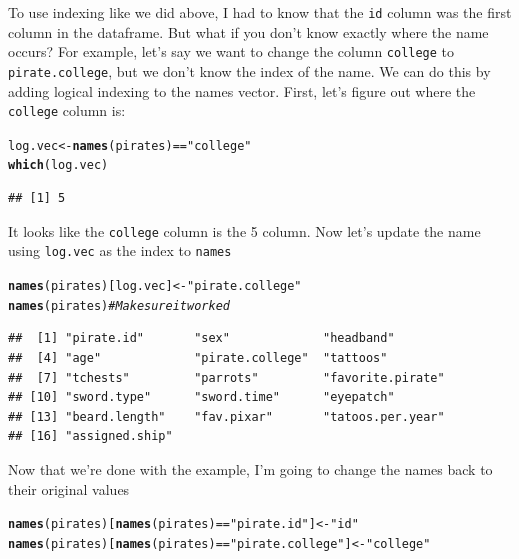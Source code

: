 \documentclass{tufte-book}\usepackage[]{graphicx}\usepackage[]{color}
\makeatletter
\newcommand{\hlstr}[1]{\textcolor[rgb]{0.192,0.494,0.8}{#1}}%
\newcommand{\hlcom}[1]{\textcolor[rgb]{0.678,0.584,0.686}{\textit{#1}}}%
\newcommand{\hlopt}[1]{\textcolor[rgb]{0,0,0}{#1}}%
\newcommand{\hlstd}[1]{\textcolor[rgb]{0.345,0.345,0.345}{#1}}%
\newcommand{\hlkwb}[1]{\textcolor[rgb]{0.69,0.353,0.396}{#1}}%
\newcommand{\hlkwd}[1]{\textcolor[rgb]{0.737,0.353,0.396}{\textbf{#1}}}%
\newenvironment{kframe}{%
 \def\at@end@of@kframe{}%
 \ifinner\ifhmode%
  \def\at@end@of@kframe{\end{minipage}}%
  \begin{minipage}{\columnwidth}%
 \fi\fi%
 \def\FrameCommand##1{\hskip\@totalleftmargin \hskip-\fboxsep
 \colorbox{shadecolor}{##1}\hskip-\fboxsep
     \hskip-\linewidth \hskip-\@totalleftmargin \hskip\columnwidth}%
 \MakeFramed {\advance\hsize-\width
   \@totalleftmargin\z@ \linewidth\hsize
   \@setminipage}}%
 {\par\unskip\endMakeFramed%
 \at@end@of@kframe}
\newenvironment{knitrout}{}{} %
\makeatother
\begin{document}
To use indexing like we did above, I had to know that the \texttt{id} column was the first column in the dataframe. But what if you don't know exactly where the name occurs? For example, let's say we want to change the column \texttt{college} to \texttt{pirate.college}, but we don't know the index of the name. We can do this by adding logical indexing to the names vector. First, let's figure out where the \texttt{college} column is:

\begin{knitrout}
\color{fgcolor}\begin{kframe}
\begin{alltt}
\hlstd{log.vec} \hlkwb{<-} \hlkwd{names}\hlstd{(pirates)} \hlopt{==} \hlstr{"college"}
\hlkwd{which}\hlstd{(log.vec)}
\end{alltt}
\begin{verbatim}
## [1] 5
\end{verbatim}
\end{kframe}
\end{knitrout}

It looks like the \texttt{college} column is the 5 column. Now let's update the name using \texttt{log.vec} as the index to \texttt{names}

\begin{knitrout}
\color{fgcolor}\begin{kframe}
\begin{alltt}
\hlkwd{names}\hlstd{(pirates)[log.vec]} \hlkwb{<-} \hlstr{"pirate.college"}
\hlkwd{names}\hlstd{(pirates)} \hlcom{# Make sure it worked}
\end{alltt}
\begin{verbatim}
##  [1] "pirate.id"       "sex"             "headband"       
##  [4] "age"             "pirate.college"  "tattoos"        
##  [7] "tchests"         "parrots"         "favorite.pirate"
## [10] "sword.type"      "sword.time"      "eyepatch"       
## [13] "beard.length"    "fav.pixar"       "tatoos.per.year"
## [16] "assigned.ship"
\end{verbatim}
\end{kframe}
\end{knitrout}

Now that we're done with the example, I'm going to change the names back to their original values

\begin{knitrout}
\color{fgcolor}\begin{kframe}
\begin{alltt}
\hlkwd{names}\hlstd{(pirates)[}\hlkwd{names}\hlstd{(pirates)} \hlopt{==} \hlstr{"pirate.id"}\hlstd{]} \hlkwb{<-} \hlstr{"id"}
\hlkwd{names}\hlstd{(pirates)[}\hlkwd{names}\hlstd{(pirates)} \hlopt{==} \hlstr{"pirate.college"}\hlstd{]} \hlkwb{<-} \hlstr{"college"}
\end{alltt}
\end{kframe}
\end{knitrout}
\end{document}
